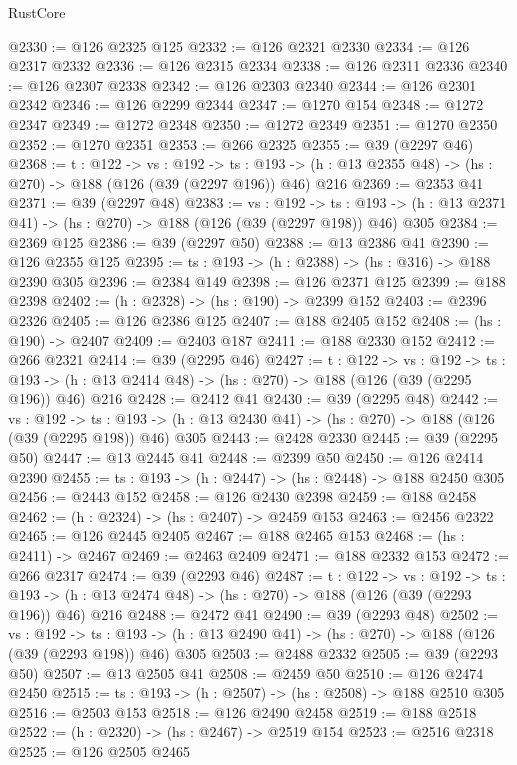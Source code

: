 \begin{lexlean}{RustCore}
\begin{coremodule}
@2330 := @126 @2325 @125
@2332 := @126 @2321 @2330
@2334 := @126 @2317 @2332
@2336 := @126 @2315 @2334
@2338 := @126 @2311 @2336
@2340 := @126 @2307 @2338
@2342 := @126 @2303 @2340
@2344 := @126 @2301 @2342
@2346 := @126 @2299 @2344
@2347 := @1270 @154
@2348 := @1272 @2347
@2349 := @1272 @2348
@2350 := @1272 @2349
@2351 := @1270 @2350
@2352 := @1270 @2351
@2353 := @266 @2325
@2355 := @39 (@2297 @46)
@2368 := {t : @122} ->
  {vs : @192} ->
  {ts : @193} -> (h : @13 @2355 @48) -> (hs : @270) -> @188 (@126 (@39 (@2297 @196)) @46) @216
@2369 := @2353 @41
@2371 := @39 (@2297 @48)
@2383 := {vs : @192} ->
  {ts : @193} -> (h : @13 @2371 @41) -> (hs : @270) -> @188 (@126 (@39 (@2297 @198)) @46) @305
@2384 := @2369 @125
@2386 := @39 (@2297 @50)
@2388 := @13 @2386 @41
@2390 := @126 @2355 @125
@2395 := {ts : @193} -> (h : @2388) -> (hs : @316) -> @188 @2390 @305
@2396 := @2384 @149
@2398 := @126 @2371 @125
@2399 := @188 @2398
@2402 := (h : @2328) -> (hs : @190) -> @2399 @152
@2403 := @2396 @2326
@2405 := @126 @2386 @125
@2407 := @188 @2405 @152
@2408 := (hs : @190) -> @2407
@2409 := @2403 @187
@2411 := @188 @2330 @152
@2412 := @266 @2321
@2414 := @39 (@2295 @46)
@2427 := {t : @122} ->
  {vs : @192} ->
  {ts : @193} -> (h : @13 @2414 @48) -> (hs : @270) -> @188 (@126 (@39 (@2295 @196)) @46) @216
@2428 := @2412 @41
@2430 := @39 (@2295 @48)
@2442 := {vs : @192} ->
  {ts : @193} -> (h : @13 @2430 @41) -> (hs : @270) -> @188 (@126 (@39 (@2295 @198)) @46) @305
@2443 := @2428 @2330
@2445 := @39 (@2295 @50)
@2447 := @13 @2445 @41
@2448 := @2399 @50
@2450 := @126 @2414 @2390
@2455 := {ts : @193} -> (h : @2447) -> (hs : @2448) -> @188 @2450 @305
@2456 := @2443 @152
@2458 := @126 @2430 @2398
@2459 := @188 @2458
@2462 := (h : @2324) -> (hs : @2407) -> @2459 @153
@2463 := @2456 @2322
@2465 := @126 @2445 @2405
@2467 := @188 @2465 @153
@2468 := (hs : @2411) -> @2467
@2469 := @2463 @2409
@2471 := @188 @2332 @153
@2472 := @266 @2317
@2474 := @39 (@2293 @46)
@2487 := {t : @122} ->
  {vs : @192} ->
  {ts : @193} -> (h : @13 @2474 @48) -> (hs : @270) -> @188 (@126 (@39 (@2293 @196)) @46) @216
@2488 := @2472 @41
@2490 := @39 (@2293 @48)
@2502 := {vs : @192} ->
  {ts : @193} -> (h : @13 @2490 @41) -> (hs : @270) -> @188 (@126 (@39 (@2293 @198)) @46) @305
@2503 := @2488 @2332
@2505 := @39 (@2293 @50)
@2507 := @13 @2505 @41
@2508 := @2459 @50
@2510 := @126 @2474 @2450
@2515 := {ts : @193} -> (h : @2507) -> (hs : @2508) -> @188 @2510 @305
@2516 := @2503 @153
@2518 := @126 @2490 @2458
@2519 := @188 @2518
@2522 := (h : @2320) -> (hs : @2467) -> @2519 @154
@2523 := @2516 @2318
@2525 := @126 @2505 @2465

\end{coremodule}
\end{lexlean}
